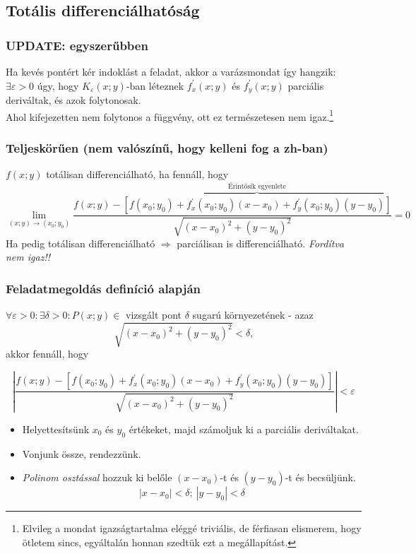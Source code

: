 \documentclass[a4paper,12pt]{article}
\begin{document}
\subsection{Totális differenciálhatóság}

\subsubsection{UPDATE: egyszerűbben}
Ha kevés pontért kér indoklást a feladat, akkor a varázsmondat így hangzik: $\exists \varepsilon > 0$ úgy, hogy $K_{\varepsilon}(x;y)$-ban léteznek $f^ {'}_x(x;y)$ és $f^{'}_y(x;y)$ parciális deriváltak, és azok folytonosak. \\
Ahol kifejezetten nem folytonos a függvény, ott ez természetesen nem igaz.\footnote{Elvileg a mondat igazságtartalma eléggé triviális, de férfiasan elismerem, hogy ötletem sincs, egyáltalán honnan szedtük ezt a megállapítást.}

\subsubsection{Teljeskörűen (nem valószínű, hogy kelleni fog a zh-ban)}

$f(x;y)$ totálisan differenciálható, ha fennáll, hogy
\begin{equation}
  \lim_{(x;y) \rightarrow (x_0;y_0)} \frac{f(x;y) - \overbrace{\left[ f(x_0;y_0) + f^{'}_x(x_0;y_0)(x-x_0) + f^{'}_y(x_0;y_0)(y-y_0)  \right]}^{\text{Érintősík egyenlete}}}{\sqrt{(x-x_0)^2 + (y-y_0)^2}} = 0
\end{equation}
Ha pedig totálisan differenciálható $\Rightarrow$ parciálisan is differenciálható. \emph{Fordítva nem igaz!!}

\newpage

\subsubsection*{Feladatmegoldás definíció alapján}

$\forall \varepsilon > 0: \exists \delta > 0: P(x;y) \in$ vizsgált pont $\delta$ sugarú környezetének - azaz
\[
  \sqrt{(x-x_0)^2 + (y-y_0)^2} < \delta \text{,}
\]
akkor fennáll, hogy

\begin{equation}
  \left| \frac{f(x;y) - \left[ f(x_0;y_0) + f^{'}_x(x_0;y_0)(x-x_0) + f^{'}_y(x_0;y_0)(y-y_0)  \right]}{\sqrt{(x-x_0)^2 + (y-y_0)^2}} \right| < \varepsilon
\end{equation}
\begin{itemize}
\item Helyettesítsünk $x_0$ és $y_0$ értékeket, majd számoljuk ki a parciális deriváltakat.
\item Vonjunk össze, rendezzünk.
\item \emph{Polinom osztással} hozzuk ki belőle $(x-x_0)$-t és $(y-y_0)$-t és becsüljünk.
  \[
    |x-x_0| < \delta;\ |y-y_0| < \delta
  \]
\end{itemize}
\end{document}
